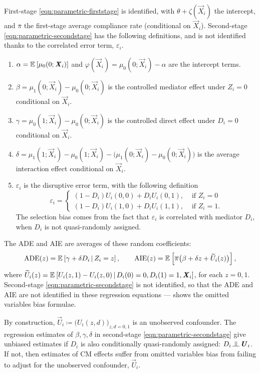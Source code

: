First-stage \eqref{eqn:parametric-firststage} is identified, with $\theta + \zeta(\vec X_i)$ the intercept, and $\bar \pi$ the first-stage average compliance rate (conditional on $\vec X_i$).
Second-stage \eqref{eqn:parametric-secondstage} has the following definitions, and is not identified thanks to the correlated error term, $\varepsilon_i$.
\begin{enumerate}[label=\textbf{(\alph*)}]
    \item $\alpha = \mathbb{E}_{} \left[ \mu_0(0; \boldsymbol{\mathit{X}}_i) \right]$ and $\varphi(\vec X_i) = \mu_0(0; \vec X_i) - \alpha$ are the intercept terms.
    \item $\beta = \mu_1(0; \vec X_i) - \mu_0(0; \vec X_i)$ is the controlled mediator effect under $Z_i = 0$ conditional on $\vec X_i$.
    \item $\gamma = \mu_0(1; \vec X_i) - \mu_0(0; \vec X_i)$ is the controlled direct effect under $D_i = 0$ conditional on $\vec X_i$.
    \item $\delta = \mu_1(1; \vec X_i) - \mu_0(1; \vec X_i) - \big( \mu_1(0; \vec X_i) - \mu_0(0; \vec X_i) \big)$ is the average interaction effect conditional on $\vec X_i$.
    \item $\varepsilon_i$ is the disruptive error term, with the following definition
    \[ \varepsilon_i = \begin{cases}
        \left(1 - D_i \right) U_i(0,0) + D_i U_i(0,1),& \text{ if } Z_i = 0 \\
        \left(1 - D_i \right) U_i(1,0) + D_i U_i(1,1),& \text{ if } Z_i = 1.
\end{cases} \]
    The selection bias comes from the fact that $\varepsilon_i$ is correlated with mediator $D_i$, when $D_i$ is not quasi-randomly assigned.
\end{enumerate}

The ADE and AIE are averages of these random coefficients:
\[ \text{ADE}(z) = \mathbb{E}_{} \left[ \gamma + \delta D_i \, \middle\vert \, Z_i = z \right], \qquad
\text{AIE}(z) = \mathbb{E}_{} \left[  \overline{\pi} \big( \beta +  \delta z + \widetilde{U}_i(z) \big) \right], \]
where $\widetilde{U}_i(z) = \mathbb{E}_{} \left[  U_i(z, 1) - U_i(z, 0) \, \middle\vert \, D_i(0)=0, D_i(1)=1, \boldsymbol{\mathit{X}}_i \right]$, for each $z=0,1$.
Second-stage \eqref{eqn:parametric-secondstage} is not identified, so that the ADE and AIE are not identified in these regression equations ---  shows the omitted variables bias formulae.

By construction, $\vec U_i \coloneqq \big(U_i(z,d) \big)_{z,d =0,1}$ is an unobserved confounder.
The regression estimates of $\beta, \gamma, \delta$ in second-stage \eqref{eqn:parametric-secondstage} give unbiased estimates if $D_i$ is also conditionally quasi-randomly assigned: $D_i \indep  \vec U_{i} $.
If not, then estimates of CM effects suffer from omitted variables bias from failing to adjust for the unobserved confounder, $\vec U_i$.

